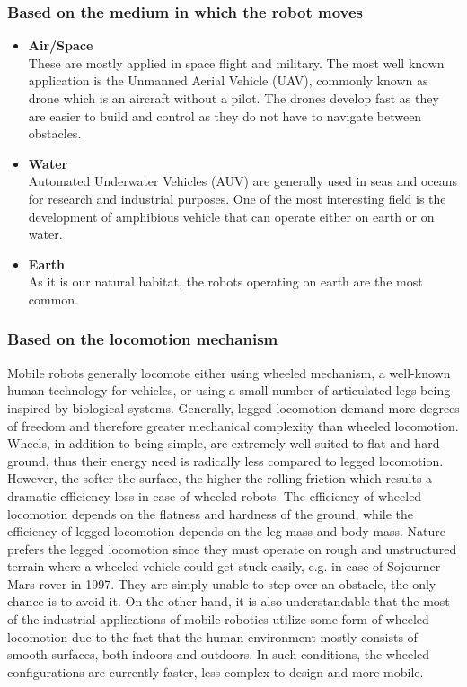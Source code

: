 \documentclass[12pt,english,twoside]{article}
\begin{document}
\subsubsection{Based on the medium in which the robot moves}
\begin{itemize}
	\item \textbf{Air/Space} \\
		These are mostly applied in space flight and military. The most well known application is the Unmanned Aerial Vehicle (UAV), commonly known as drone which is an aircraft without a pilot. The drones develop fast as they are easier to build and control as they do not have to navigate between obstacles.
	\item \textbf{Water} \\
		Automated Underwater Vehicles (AUV) are generally used in seas and oceans for research and industrial purposes. One of the most interesting field is the development of amphibious vehicle that can operate either on earth or on water.
	\item \textbf{Earth} \\
		As it is our natural habitat, the robots operating on earth are the most common.	\cite{sieg} \cite{rirt}
\end{itemize}
\subsubsection{Based on the locomotion mechanism}
Mobile robots generally locomote either using wheeled mechanism, a well-known human technology for vehicles, or using a small number of articulated legs being inspired by biological systems. Generally, legged locomotion demand more degrees of freedom and therefore greater mechanical complexity than wheeled locomotion. Wheels, in addition to being simple, are extremely well suited to flat and hard ground, thus their energy need is radically less compared to legged locomotion. However, the softer the surface, the higher the rolling friction which results a dramatic efficiency loss in case of wheeled robots. The efficiency of wheeled locomotion depends on the flatness and hardness of the ground, while the efficiency of legged locomotion depends on the leg mass and body mass. Nature prefers the legged locomotion since they must operate on rough and unstructured terrain where a wheeled vehicle could get stuck easily, e.g. in case of Sojourner Mars rover in 1997. They are simply unable to step over an obstacle, the only chance is to avoid it.
On the other hand, it is also understandable that the most of the industrial applications of mobile robotics utilize some form of wheeled locomotion due to the fact that the human environment mostly consists of smooth surfaces, both indoors and outdoors. In such conditions, the wheeled configurations are currently faster, less complex to design and more mobile.
\end{document}
